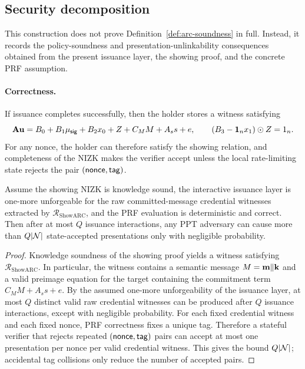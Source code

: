 \subsection{Security decomposition}
This construction does not prove Definition~\ref{def:arc-soundness} in full.  Instead, it records the policy-soundness
and presentation-unlinkability consequences obtained from the present issuance layer, the showing proof, and the
concrete PRF assumption.

\paragraph{Correctness.}
If issuance completes successfully, then the holder stores a witness satisfying
\[
  \mathbf{A}\mathbf{u}=B_0+B_1\mu_{\mathsf{sig}}+B_2x_0+Z+C_MM+A_s s+e,
  \qquad
  (B_3-\mathbf 1_nx_1)\odot Z=1_n.
\]
For any nonce, the holder can therefore satisfy the showing relation, and completeness of the NIZK makes the
verifier accept unless the local rate-limiting state rejects the pair \((\mathsf{nonce},\mathsf{tag})\).

\begin{proposition}\label{prop:arc-policy-soundness}
Assume the showing NIZK is knowledge sound, the interactive issuance layer is one-more unforgeable for the raw
committed-message credential witnesses extracted by \(\mathcal R_{\mathrm{ShowARC}}\), and the PRF evaluation is
deterministic and correct.  Then after at most \(Q\) issuance interactions, any PPT adversary can cause more than
\(Q|\mathcal{N}|\) state-accepted presentations only with negligible probability.
\end{proposition}

\begin{proof}
Knowledge soundness of the showing proof yields a witness satisfying \(\mathcal R_{\mathrm{ShowARC}}\).  In
particular, the witness contains a semantic message \(M=\mathbf{m}\Vert\mathbf{k}\) and a valid preimage equation for the
target containing the commitment term \(C_MM+A_s s+e\).  By the assumed one-more unforgeability of the issuance
layer, at most \(Q\) distinct valid raw credential witnesses can be produced after \(Q\) issuance interactions,
except with negligible probability.  For each fixed credential witness and each fixed nonce, PRF correctness fixes a
unique tag.  Therefore a stateful verifier that rejects repeated \((\mathsf{nonce},\mathsf{tag})\) pairs can accept at most one
presentation per nonce per valid credential witness.  This gives the bound \(Q|\mathcal{N}|\); accidental tag
collisions only reduce the number of accepted pairs.
\end{proof}

